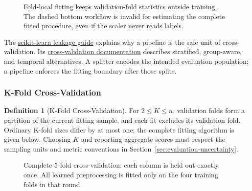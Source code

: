 \documentclass[11pt,twoside]{article}
\numberwithin{equation}{section}
\theoremstyle{plain}
\theoremstyle{definition}
\newtheorem{definition}[theorem]{Definition}
\theoremstyle{remark}
\begin{document}
\begin{figure}[H]
\centering
{}
\caption{Fold-local fitting keeps validation-fold statistics outside training. The dashed bottom workflow is invalid for estimating the complete fitted procedure, even if the scaler never reads labels.}
\end{figure}

The \href{https://scikit-learn.org/stable/common_pitfalls.html}{scikit-learn leakage guide} explains why a pipeline is the safe unit of cross-validation. Its \href{https://scikit-learn.org/stable/modules/cross_validation.html}{cross-validation documentation} describes stratified, group-aware, and temporal alternatives. A splitter encodes the intended evaluation population; a pipeline enforces the fitting boundary after those splits.

\subsubsection{K-Fold Cross-Validation}

\begin{definition}[K-Fold Cross-Validation]
For $2\le K\le n$, validation folds form a partition of the current fitting
sample, and each fit excludes its validation fold. Ordinary K-fold sizes
differ by at most one; the complete fitting algorithm is given below.
Choosing $K$ and reporting aggregate scores must respect the sampling units
and metric conventions in Section~\ref{sec:evaluation-uncertainty}.
\end{definition}

\begin{figure}[H]
\centering
{}
\caption{Complete 5-fold cross-validation: each column is held out exactly once. All learned preprocessing is fitted only on the four training folds in that round.}
\end{figure}
\end{document}
